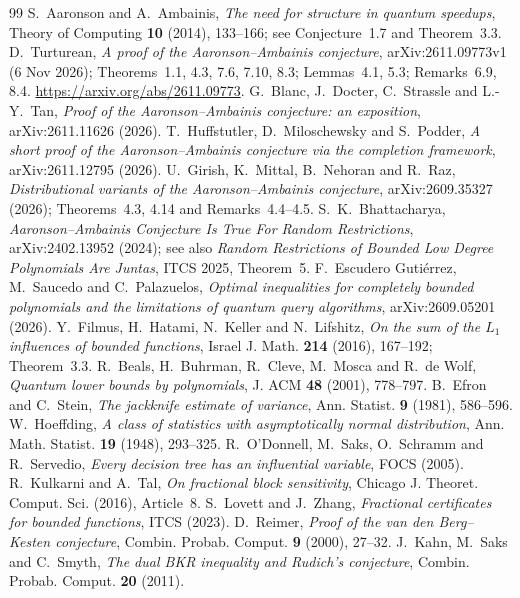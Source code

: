 \documentclass[11pt]{article}
\numberwithin{equation}{section}
\theoremstyle{remark}
\begin{document}
\begin{thebibliography}{99}\small
{} S.~Aaronson and A.~Ambainis, \emph{The need for structure in quantum speedups}, Theory of Computing \textbf{10} (2014), 133--166; see Conjecture~1.7 and Theorem~3.3.
 D.~Turturean, \emph{A proof of the Aaronson--Ambainis conjecture}, arXiv:2611.09773v1 (6 Nov 2026); Theorems~1.1, 4.3, 7.6, 7.10, 8.3; Lemmas~4.1, 5.3; Remarks~6.9, 8.4. \url{https://arxiv.org/abs/2611.09773}.
 G.~Blanc, J.~Docter, C.~Strassle and L.-Y.~Tan, \emph{Proof of the Aaronson--Ambainis conjecture: an exposition}, arXiv:2611.11626 (2026).
 T.~Huffstutler, D.~Miloschewsky and S.~Podder, \emph{A short proof of the Aaronson--Ambainis conjecture via the completion framework}, arXiv:2611.12795 (2026).
 U.~Girish, K.~Mittal, B.~Nehoran and R.~Raz, \emph{Distributional variants of the Aaronson--Ambainis conjecture}, arXiv:2609.35327 (2026); Theorems~4.3, 4.14 and Remarks~4.4--4.5.
 S.~K.~Bhattacharya, \emph{Aaronson--Ambainis Conjecture Is True For Random Restrictions}, arXiv:2402.13952 (2024); see also \emph{Random Restrictions of Bounded Low Degree Polynomials Are Juntas}, ITCS 2025, Theorem~5.
 F.~Escudero Guti\'errez, M.~Saucedo and C.~Palazuelos, \emph{Optimal inequalities for completely bounded polynomials and the limitations of quantum query algorithms}, arXiv:2609.05201 (2026).
 Y.~Filmus, H.~Hatami, N.~Keller and N.~Lifshitz, \emph{On the sum of the $L_1$ influences of bounded functions}, Israel J. Math. \textbf{214} (2016), 167--192; Theorem~3.3.
 R.~Beals, H.~Buhrman, R.~Cleve, M.~Mosca and R.~de Wolf, \emph{Quantum lower bounds by polynomials}, J. ACM \textbf{48} (2001), 778--797.
 B.~Efron and C.~Stein, \emph{The jackknife estimate of variance}, Ann. Statist. \textbf{9} (1981), 586--596.
 W.~Hoeffding, \emph{A class of statistics with asymptotically normal distribution}, Ann. Math. Statist. \textbf{19} (1948), 293--325.
 R.~O'Donnell, M.~Saks, O.~Schramm and R.~Servedio, \emph{Every decision tree has an influential variable}, FOCS (2005).
 R.~Kulkarni and A.~Tal, \emph{On fractional block sensitivity}, Chicago J. Theoret. Comput. Sci. (2016), Article~8.
 S.~Lovett and J.~Zhang, \emph{Fractional certificates for bounded functions}, ITCS (2023).
 D.~Reimer, \emph{Proof of the van den Berg--Kesten conjecture}, Combin. Probab. Comput. \textbf{9} (2000), 27--32.
 J.~Kahn, M.~Saks and C.~Smyth, \emph{The dual BKR inequality and Rudich's conjecture}, Combin. Probab. Comput. \textbf{20} (2011).

\end{thebibliography}
\end{document}
